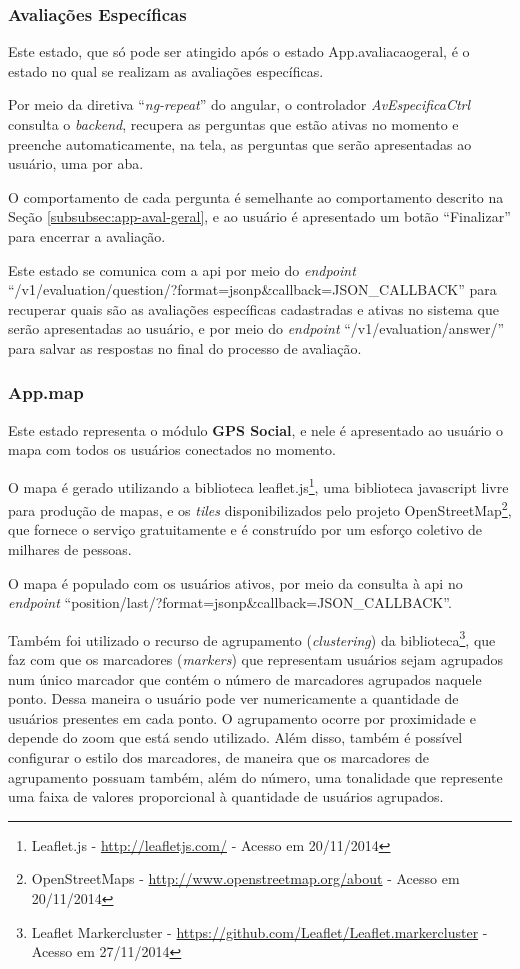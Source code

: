 \subsubsection{Avaliações Específicas}
Este estado, que só pode ser atingido após o estado App.avaliacaogeral, é o estado no qual se realizam as avaliações específicas.

Por meio da diretiva ``\textit{ng-repeat}'' do \gls{angular}, o controlador \textit{AvEspecificaCtrl} consulta o \textit{backend}, recupera as perguntas que estão ativas no momento e preenche automaticamente, na tela, as perguntas que serão apresentadas ao usuário, uma por aba.

O comportamento de cada pergunta é semelhante ao comportamento descrito na Seção \ref{subsubsec:app-aval-geral}, e ao usuário é apresentado um botão ``Finalizar'' para encerrar a avaliação.

Este estado se comunica com a \gls{api} por meio do \textit{endpoint} ``/v1/evaluation/question/?format=jsonp\&callback=JSON\_CALLBACK'' para recuperar quais são as avaliações específicas cadastradas e ativas no sistema que serão apresentadas ao usuário, e por meio do \textit{endpoint} ``/v1/evaluation/answer/'' para salvar as respostas no final do processo de avaliação.

\subsubsection{App.map}
Este estado representa o módulo \textbf{GPS Social}, e nele é apresentado ao usuário o mapa com todos os usuários conectados no momento.

O mapa é gerado utilizando a biblioteca leaflet.js\footnote{Leaflet.js - \url{http://leafletjs.com/} - Acesso em 20/11/2014}, uma biblioteca javascript livre para produção de mapas, e os \textit{tiles} disponibilizados pelo projeto OpenStreetMap\footnote{OpenStreetMaps - \url{http://www.openstreetmap.org/about} - Acesso em 20/11/2014}, que fornece o serviço gratuitamente e é construído por um esforço coletivo de milhares de pessoas.

O mapa é populado com os usuários ativos, por meio da consulta à \gls{api} no \textit{endpoint} ``position/last/?format=jsonp\&callback=JSON\_CALLBACK''.

Também foi utilizado o recurso de agrupamento (\textit{clustering}) da biblioteca\footnote{Leaflet Markercluster - \url{https://github.com/Leaflet/Leaflet.markercluster} - Acesso em 27/11/2014}, que faz com que os marcadores (\textit{markers}) que representam usuários sejam agrupados num único marcador que contém o número de marcadores agrupados naquele ponto. Dessa maneira o usuário pode ver numericamente a quantidade de usuários presentes em cada ponto. O agrupamento ocorre por proximidade e depende do zoom que está sendo utilizado. Além disso, também é possível configurar o estilo dos marcadores, de maneira que os marcadores de agrupamento possuam também, além do número, uma tonalidade que represente uma faixa de valores proporcional à quantidade de usuários agrupados.


